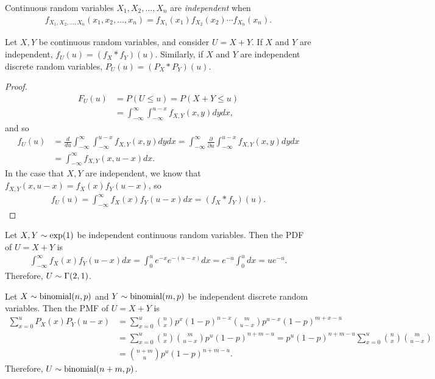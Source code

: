 \begin{defn}
    Continuous random variables $X_1, X_2, \ldots, X_n$ are \emph{independent} when
    \begin{align*}
        f_{X_1,X_2,\ldots,X_n}(x_1, x_2, \ldots, x_n) = f_{X_1}(x_1)f_{X_2}(x_2)\cdots f_{X_n}(x_n).
    \end{align*}
\end{defn}

\begin{prop}
    Let $X, Y$ be continuous random variables, and consider $U = X + Y$. If $X$ and $Y$ are independent,
    $f_U(u) = (f_X * f_Y)(u)$. Similarly, if $X$ and $Y$ are independent discrete random variables,
    $P_U(u) = (P_X * P_Y)(u)$.
\end{prop}

\begin{proof}
    \begin{align*}
        F_U(u) &= P(U \leq u) = P(X + Y \leq u) \\
        &= \int_{-\infty}^{\infty}\int_{-\infty}^{u-x}f_{X,Y}(x,y)dydx,
    \end{align*}
    and so
    \begin{align*}
        f_U(u) &= \frac{d}{du}\int_{-\infty}^{\infty}\int_{-\infty}^{u-x}f_{X,Y}(x,y)dydx = \int_{-\infty}^{\infty}\frac{\partial}{\partial u}\int_{-\infty}^{u-x}f_{X,Y}(x,y)dydx \\
        &= \int_{-\infty}^{\infty}f_{X,Y}(x,u-x)dx.
    \end{align*}
    In the case that $X,Y$ are independent, we know that $f_{X,Y}(x,u-x) = f_X(x)f_Y(u-x)$, so
    \begin{align*}
        f_U(u) = \int_{-\infty}^{\infty}f_X(x)f_Y(u-x)dx = (f_X * f_Y)(u).
    \end{align*}
\end{proof}

\begin{exmp}
    Let $X,Y \sim \mathrm{exp}(1)$ be independent continuous random variables. Then the PDF of $U = X+Y$ is
    \begin{align*}
        \int_{-\infty}^{\infty}f_X(x)f_Y(u-x)dx = \int_{0}^{u}e^{-x}e^{-(u-x)}dx = e^{-u}\int_{0}^{u}dx = ue^{-u}.
    \end{align*}
    Therefore, $U \sim \Gamma(2, 1)$.
\end{exmp}

\begin{exmp}
    Let $X \sim \mathrm{binomial}(n,p)$ and $Y \sim \mathrm{binomial}(m, p)$ be independent discrete random variables. Then the PMF of $U = X+Y$ is
    \begin{align*}
        \sum_{x=0}^{u}P_X(x)P_Y(u-x) &= \sum_{x=0}^{u}\binom{n}{x}p^{x}(1-p)^{n-x}\binom{m}{u-x}p^{u-x}(1-p)^{m+x-u} \\
        &= \sum_{x=0}^{u}\binom{n}{x}\binom{m}{u-x}p^{u}(1-p)^{n+m-u} = p^{u}(1-p)^{n+m-u}\sum_{x=0}^{u}\binom{n}{x}\binom{m}{u-x} \\
        &= \binom{n+m}{u}p^{u}(1-p)^{n+m-u}.
    \end{align*}
    Therefore, $U \sim \mathrm{binomial}(n+m, p)$.
\end{exmp}

